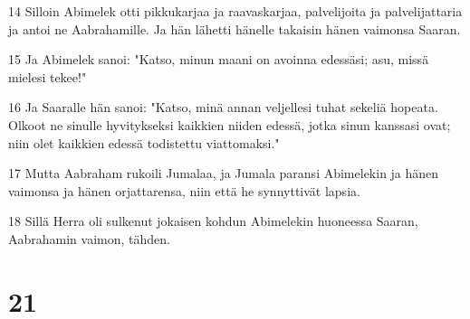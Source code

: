 \par 14 Silloin Abimelek otti pikkukarjaa ja raavaskarjaa, palvelijoita ja palvelijattaria ja antoi ne Aabrahamille. Ja hän lähetti hänelle takaisin hänen vaimonsa Saaran.
\par 15 Ja Abimelek sanoi: "Katso, minun maani on avoinna edessäsi; asu, missä mielesi tekee!"
\par 16 Ja Saaralle hän sanoi: "Katso, minä annan veljellesi tuhat sekeliä hopeata. Olkoot ne sinulle hyvitykseksi kaikkien niiden edessä, jotka sinun kanssasi ovat; niin olet kaikkien edessä todistettu viattomaksi."
\par 17 Mutta Aabraham rukoili Jumalaa, ja Jumala paransi Abimelekin ja hänen vaimonsa ja hänen orjattarensa, niin että he synnyttivät lapsia.
\par 18 Sillä Herra oli sulkenut jokaisen kohdun Abimelekin huoneessa Saaran, Aabrahamin vaimon, tähden.

\chapter{21}

